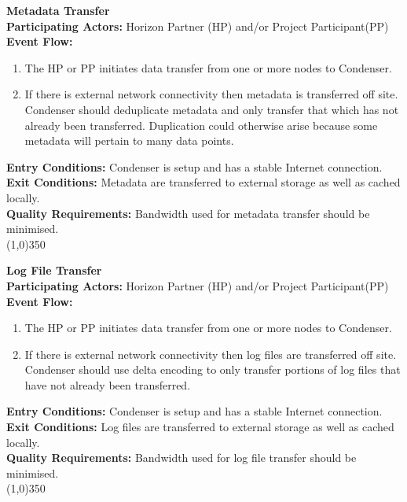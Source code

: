		\textbf{Metadata Transfer}\\	 
		\textbf{Participating Actors:} Horizon Partner (HP) and/or Project Participant(PP) \\
		\textbf{Event Flow:}
		\begin{enumerate}
\item The HP or PP initiates data transfer from one or more nodes to Condenser.
\item If there is external network connectivity then metadata is transferred off site. Condenser should deduplicate metadata and only transfer that which has not already been transferred. Duplication could otherwise arise because some metadata will pertain to many data points.
	    \end{enumerate}
		\textbf{Entry Conditions:} Condenser is setup and has a stable Internet connection.\\
		\textbf{Exit Conditions:} Metadata are transferred to external storage as well as cached locally.\\
		\textbf{Quality Requirements:} Bandwidth used for metadata transfer should be minimised.\\
		\line(1,0){350}	
		
\textbf{Log File Transfer} \\
		\textbf{Participating Actors:} Horizon Partner (HP) and/or Project Participant(PP) \\
		\textbf{Event Flow:}
		\begin{enumerate}
\item The HP or PP initiates data transfer from one or more nodes to Condenser.
\item If there is external network connectivity then log files are transferred off site. Condenser should use delta encoding to only transfer portions of log files that have not already been transferred.
	    \end{enumerate}
		\textbf{Entry Conditions:} Condenser is setup and has a stable Internet connection.\\
		\textbf{Exit Conditions:} Log files are transferred to external storage as well as cached locally.\\
		\textbf{Quality Requirements:} Bandwidth used for log file transfer should be minimised.\\
		\line(1,0){350}			
			 
